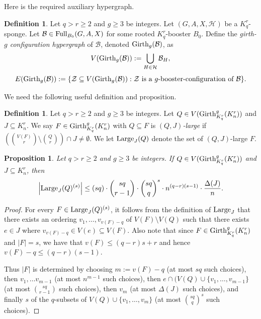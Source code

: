 \documentclass[11pt]{article}
\newcommand{\mc}[1]{\mathcal{#1}}
\newcounter{i}
\theoremstyle{plain}
\newtheorem{proposition}[thm]{Proposition}
\theoremstyle{plain} %
\theoremstyle{definition}
\newtheorem{definition}[thm]{Definition}
\begin{document}
Here is the required auxiliary hypergraph.

\begin{definition}\label{def:GirthConfig}
Let $q>r\ge 2$ and $g\ge 3$ be integers. Let $(G,A,X,\mc{H})$ be a $K_q^r$-sponge. Let $\mc{B} \in {\rm Full}_{B_0}(G,A,X)$ for some rooted $K_q^r$-booster $B_0$.
Define the \emph{girth-$g$ configuration hypergraph} of $\mc{B}$, denoted ${\rm Girth}_g(\mc{B})$, as
$$V({\rm Girth}_g(\mc{B})) := \bigcup_{H\in \mc{H}} \mc{B}_H,$$
$$E({\rm Girth}_g(\mc{B})):= \{ \mc{Z}\subseteq V({\rm Girth}_g(\mc{B})): \mc{Z} \text{ is a $g$-booster-configuration of } \mc{B}\}.$$
\end{definition}

We need the following useful definition and proposition.

\begin{definition}
Let $q > r \ge 2$ and $g\ge 3$ be integers. Let $Q\in V({\rm Girth}_{K_q^r}^g(K_n^r))$ and $J\subseteq K_n^r$. We say $F\in {\rm Girth}_{K_q^r}^g(K_n^r)$ with $Q\subseteq F$ is \emph{$(Q,J)$-large} if $\left(\binom{V(F)}{r}\setminus \binom{Q}{r}\right)\cap J\ne \emptyset$. We let ${\rm Large}_J(Q)$ denote the set of $(Q,J)$-large $F$.
\end{definition}
\begin{proposition}\label{prop:LargeIntersect}
Let $q > r \ge 2$ and $g\ge 3$ be integers. If $Q\in V({\rm Girth}_{K_q^r}^g(K_n^r))$ and $J\subseteq K_n^r$, then     
$$\left|{\rm Large}_J(Q)^{(s)} \right| \le (sq)\cdot \binom{sq}{r-1}\cdot \binom{sq}{q}^s\cdot n^{(q-r)(s-1)}\cdot \frac{\Delta(J)}{n}.$$
\end{proposition}
\begin{proof}
For every $F\in {\rm Large}_J(Q)^{(s)}$, it follows from the definition of ${\rm Large}_J$ that there exists an ordering $v_1,\ldots, v_{v(F)-q}$ of $V(F)\setminus V(Q)$ such that there exists $e\in J$ where $v_{v(F)-q} \in V(e) \subseteq V(F)$. Also note that since $F\in {\rm Girth}_{K_q^r}^g(K_n^r)$ and $|F|=s$, we have that $v(F)\le (q-r)s+r$ and hence $v(F)-q\le (q-r)(s-1)$. 

Thus $|F|$ is determined by choosing $m:= v(F)-q$ (at most $sq$ such choices), then $v_1,\ldots v_{m-1}$ (at most $n^{m-1}$ such choices), then $e\cap (V(Q)\cup \{v_1,\ldots,v_{m-1}\}$ (at most $\binom{sq}{r-1}$ such choices), then $v_m$ (at most $\Delta(J)$ such choices), and finally $s$ of the $q$-subsets of $V(Q)\cup \{v_1,\ldots,v_m\}$ (at most $\binom{sq}{q}^s$ such choices). 
\end{proof}
\end{document}
